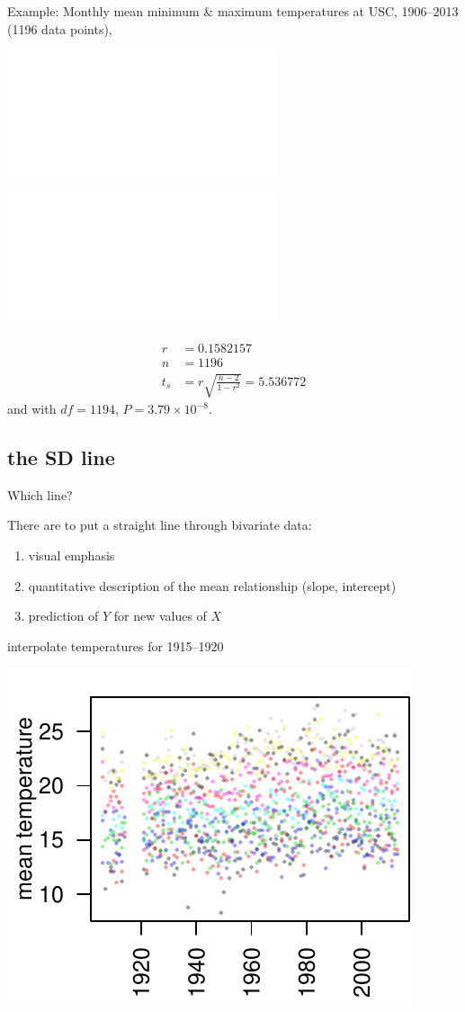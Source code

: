 \begin{frame}{Example:}
    Monthly mean minimum \& maximum temperatures
    at USC, 1906--2013  (1196 data points),
    \begin{center}
    \includegraphics<1>{usc-temps.pdf}
    \includegraphics<2>{usc-temps-stdized.pdf}
    \end{center}

    \pause
    \vspace{2em}

    \begin{align*}
        r&=0.1582157 \\
        n&=1196 \\
        t_s &= r \sqrt{\frac{n-2}{1-r^2}} = 5.536772 
    \end{align*}
    and with $df=1194$, $P=3.79\times 10^{-8}$.

\end{frame}

\subsection{the SD line}

\begin{frame}{Which line?}

    There are  to put a straight line through bivariate data:
    \begin{enumerate}
        \item visual emphasis
        \item quantitative description of the mean relationship (slope, intercept)
        \item prediction of $Y$ for new values of $X$
    \end{enumerate}


    \vspace{2em}

     interpolate temperatures for 1915--1920
    \begin{center}
    \includegraphics[width=.5\textwidth]{usc-temps.pdf}
    \end{center}

\end{frame}


